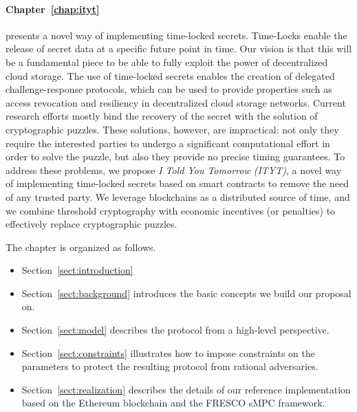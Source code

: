{\medskip

\paragraph*{Chapter~\ref{chap:ityt}} presents a novel way of implementing time-locked secrets. Time-Locks enable the release of secret data at a specific future point in time. Our vision is that this will be a fundamental piece to be able to fully exploit the power of decentralized cloud storage. The use of time-locked secrets enables the creation of delegated challenge-response protocols, which can be used to provide properties such as access revocation and resiliency in decentralized cloud storage networks.
%
Current research efforts mostly bind the recovery of the secret with the solution of cryptographic puzzles. These solutions, however, are  impractical: not only they require the interested parties to undergo a significant computational effort in order to solve the puzzle, but also they provide no precise timing guarantees.
%
To address these problems, we propose {\em I {\em Told} You Tomorrow (ITYT)}, a novel way of implementing time-locked secrets based on smart contracts to remove the need of any trusted party. We leverage blockchains as a distributed source of time, and we combine threshold cryptography with economic incentives (or penalties) to effectively replace cryptographic puzzles.

\smallskip

The chapter is organized as follows.

\begin{itemize}
	
\item Section~\ref{sect:introduction}
	
\item Section~\ref{sect:background} introduces the basic concepts we build our proposal on. 

\item Section~\ref{sect:model} describes the protocol from a high-level perspective.

\item Section~\ref{sect:constraints} illustrates how to impose constraints on the parameters to protect the resulting protocol from rational adversaries.

\item Section~\ref{sect:realization} describes the details of our reference implementation based on the Ethereum blockchain and the FRESCO sMPC framework.


\end{itemize}}
